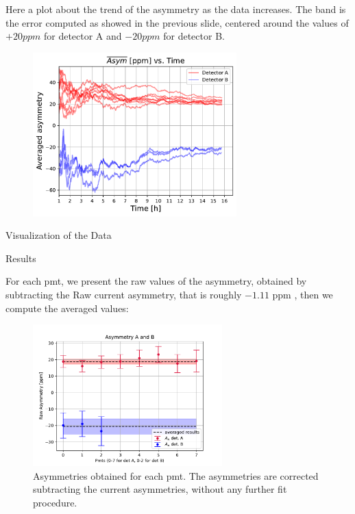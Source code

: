 \documentclass[8pt,a4paper]{beamer}
\begin{document}
\begin{frame}

Here a plot about the trend of the asymmetry as the data increases. The band is the error computed as showed in the previous slide, centered around the values of $+20ppm$ for detector A and $-20ppm$ for detector B.

\begin{figure}[hbtp]
\centering
\includegraphics[width = 0.70\textwidth]{figures/AveragedAsymmetry.pdf}
\end{figure}

\end{frame}


\begin{frame}{Visualization of the Data}

\end{frame}

\begin{frame}{Results}

For each pmt, we present the raw values of the asymmetry, obtained by subtracting the Raw current asymmetry, that is roughly $-1.11$ ppm , then we compute the averaged values:

\begin{figure}[hbtp]
\centering
\includegraphics[width = 0.65\textwidth]{figures/FirstResult.pdf}
\caption{Asymmetries obtained for each pmt. The asymmetries are corrected subtracting the current asymmetries, without any further fit procedure.}
\end{figure}
\end{frame}
\end{document}
